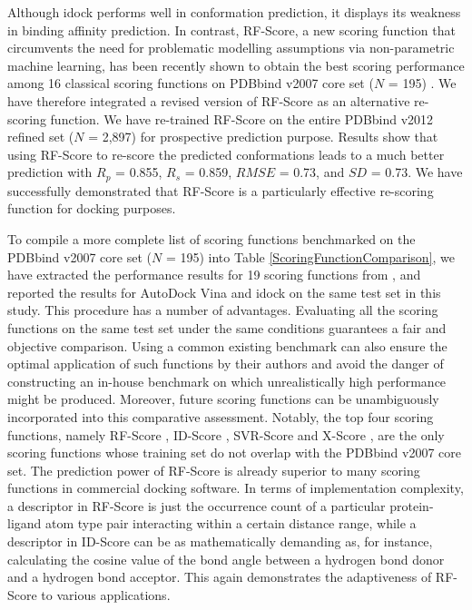 Although idock performs well in conformation prediction, it displays its weakness in binding affinity prediction. In contrast, RF-Score, a new scoring function that circumvents the need for problematic modelling assumptions via non-parametric machine learning, has been recently shown to obtain the best scoring performance among 16 classical scoring functions on PDBbind v2007 core set ($N$ = 195) \cite{564}. We have therefore integrated a revised version of RF-Score as an alternative re-scoring function. We have re-trained RF-Score on the entire PDBbind v2012 refined set ($N$ = 2,897) for prospective prediction purpose. Results show that using RF-Score to re-score the predicted conformations leads to a much better prediction with $R_p$ = 0.855, $R_s$ = 0.859, $RMSE$ = 0.73, and $SD$ = 0.73. We have successfully demonstrated that RF-Score is a particularly effective re-scoring function for docking purposes.

To compile a more complete list of scoring functions benchmarked on the PDBbind v2007 core set ($N$ = 195) into Table \ref{ScoringFunctionComparison}, we have extracted the performance results for 19 scoring functions from \cite{1313,564,1305,1295}, and reported the results for AutoDock Vina and idock on the same test set in this study. This procedure has a number of advantages. Evaluating all the scoring functions on the same test set under the same conditions guarantees a fair and objective comparison. Using a common existing benchmark can also ensure the optimal application of such functions by their authors and avoid the danger of constructing an in-house benchmark on which unrealistically high performance might be produced. Moreover, future scoring functions can be unambiguously incorporated into this comparative assessment. Notably, the top four scoring functions, namely RF-Score \cite{564}, ID-Score \cite{1305}, SVR-Score \cite{1295} and X-Score \cite{573}, are the only scoring functions whose training set do not overlap with the PDBbind v2007 core set. The prediction power of RF-Score is already superior to many scoring functions in commercial docking software. In terms of implementation complexity, a descriptor in RF-Score is just the occurrence count of a particular protein-ligand atom type pair interacting within a certain distance range, while a descriptor in ID-Score can be as mathematically demanding as, for instance, calculating the cosine value of the bond angle between a hydrogen bond donor and a hydrogen bond acceptor. This again demonstrates the adaptiveness of RF-Score to various applications.

